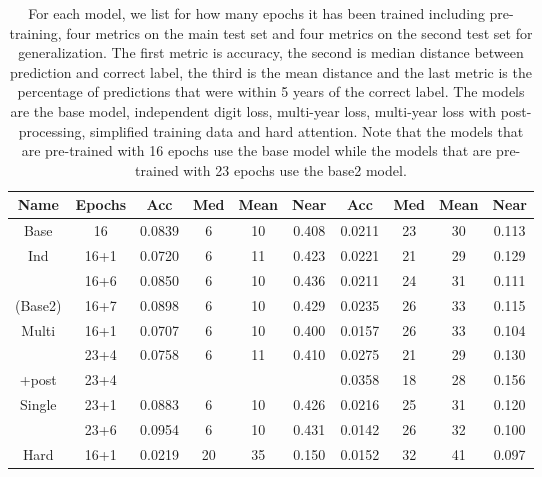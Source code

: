 
\begin{table}
  \centering
  \begin{tabular}{|c|c||c|c|c|c||c|c|c|c|}
    \hline
    Name & Epochs & Acc & Med & Mean & Near & Acc & Med & Mean & Near \\
    \hline
    Base & 16 & 0.0839 & 6 & 10 & 0.408 & 0.0211 & 23 & 30 & 0.113 \\
    \hline
    Ind & 16+1 & 0.0720 & 6 & 11 & 0.423 & 0.0221 & 21 & 29 & 0.129 \\
    & 16+6 & 0.0850 & 6 & 10 & 0.436 & 0.0211 & 24 & 31 & 0.111 \\
    (Base2) & 16+7 & 0.0898 & 6 & 10 & 0.429 & 0.0235 & 26 & 33 & 0.115 \\
    \hline
    Multi & 16+1 & 0.0707 & 6 & 10 & 0.400 & 0.0157 & 26 & 33 & 0.104 \\
    & 23+4 & 0.0758 & 6 & 11 & 0.410 & 0.0275 & 21 & 29 & 0.130 \\
    +post & 23+4 & & & & & 0.0358 & 18 & 28 & 0.156 \\
    \hline
    Single & 23+1 & 0.0883 & 6 & 10 & 0.426 & 0.0216 & 25 & 31 & 0.120 \\
    & 23+6 & 0.0954 & 6 & 10 & 0.431 & 0.0142 & 26 & 32 & 0.100 \\
    \hline
    Hard & 16+1 & 0.0219 & 20 & 35 & 0.150 & 0.0152 & 32 & 41 & 0.097 \\
    \hline
  \end{tabular}
  \caption{For each model, we list for how many epochs it has been trained including pre-training, four metrics on the main test set and four metrics on the second test set for generalization.
  The first metric is accuracy, the second is median distance between prediction and correct label, the third is the mean distance and the last metric is the percentage of predictions that were within 5 years of the correct label.
  The models are the base model, independent digit loss, multi-year loss, multi-year loss with post-processing, simplified training data and hard attention.
  Note that the models that are pre-trained with 16 epochs use the base model while the models that are pre-trained with 23 epochs use the base2 model.
  }
  \label{tab:model_overview}
\end{table}
